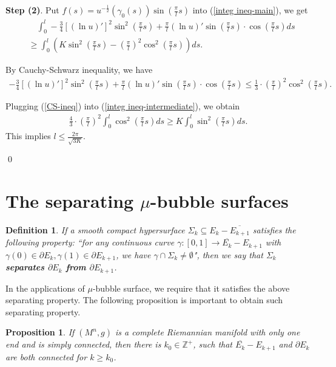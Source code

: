 \documentclass[11pt]{amsart}
\newtheorem{prop}[theorem]{Proposition}
\newtheorem{definition}[theorem]{Definition}
\numberwithin{equation}{section}
\begin{document}
{\textbf{Step (2)}. Put $f(s)= u^{-\frac{1}{2}}(\gamma_0(s))\sin(\frac{\pi}{l}s)$ into (\ref{integ ineq-main}), we get
\begin{align}
&\quad \int_0^l -\frac{3}{4}[(\ln u)']^2 \sin^2(\frac{\pi}{l}s)+ \frac{\pi}{l}(\ln u)'\sin(\frac{\pi}{l}s)\cdot \cos(\frac{\pi}{l}s) ds \nonumber \\
&\geq \int_0^l \left(K\sin^2(\frac{\pi}{l}s)- (\frac{\pi}{l})^2 \cos^2(\frac{\pi}{l}s)\right) ds. \label{integ ineq-intermediate}
\end{align}

By Cauchy-Schwarz inequality, we have
\begin{align}
-\frac{3}{4}[(\ln u)']^2 \sin^2(\frac{\pi}{l}s)+ \frac{\pi}{l}(\ln u)'\sin(\frac{\pi}{l}s)\cdot \cos(\frac{\pi}{l}s) \leq \frac{1}{3}\cdot (\frac{\pi}{l})^2\cos^2(\frac{\pi}{l}s). \label{CS-ineq}
\end{align}

Plugging (\ref{CS-ineq}) into (\ref{integ ineq-intermediate}), we obtain
\begin{align}
\frac{4}{3}\cdot (\frac{\pi}{l})^2\int_0^l\cos^2(\frac{\pi}{l}s) ds\geq K\int_0^l \sin^2(\frac{\pi}{l}s) ds. \nonumber 
\end{align}
This implies $l\leq \frac{2\pi}{\sqrt{3K}}$. 
}
\qed

\section{The separating $\mu$-bubble surfaces}\label{sec separating bubble surfaces}

\begin{definition}\label{def seperating property}
{If a smooth compact hypersurface $\Sigma_k\subseteq E_k- \overline{E_{k+ 1}}$ satisfies the following property: ``for any continuous curve $\gamma: [0, 1]\rightarrow \overline{E_k}- E_{k+ 1}$ with $\gamma(0)\in \partial E_k, \gamma(1)\in \partial E_{k+ 1}$, we have $\gamma\cap \Sigma_k\neq \emptyset$", then we say that \textbf{$\Sigma_k$ separates $\partial E_k$ from $\partial E_{k+ 1}$}. 
}
\end{definition}

In the applications of $\mu$-bubble surface, we require that it satisfies the above separating property. The following proposition is important to obtain such separating property.

\begin{prop}\label{prop connected property of annulus}
{If $(M^n,  g)$ is a complete Riemannian manifold with only one end and is simply connected,  then there is $k_0\in \mathbb{Z}^+$, such that $\overline{E_k}- E_{k+ 1}$ and $\partial E_k$ are both connected for $k\geq k_0$. 
}
\end{prop}
\end{document}
